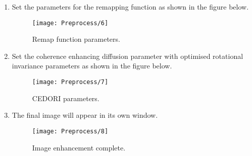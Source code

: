 \documentclass[
11pt, %
a4paper, %
oneside, %
headinclude,footinclude, %
BCOR5mm, %
]{scrartcl}
\begin{document}
\begin{enumerate}
	\item Set the parameters for the remapping function as shown in the figure below.
	\begin{figure}[h]
		\centering
		\texttt{[image: Preprocess/6]}
		\caption{Remap function parameters.}
	\end{figure}
	\newpage
	\item Set the coherence enhancing diffusion parameter with optimised rotational invariance parameters as shown in the figure below.
	\begin{figure}[h]
		\centering
		\texttt{[image: Preprocess/7]}
		\caption{CEDORI parameters.}
	\end{figure}
	
	\item The final image will appear in its own window.
	\begin{figure}[h]
		\centering
		\texttt{[image: Preprocess/8]}
		\caption{Image enhancement complete.}
	\end{figure}
\end{enumerate}




%


\end{document}
